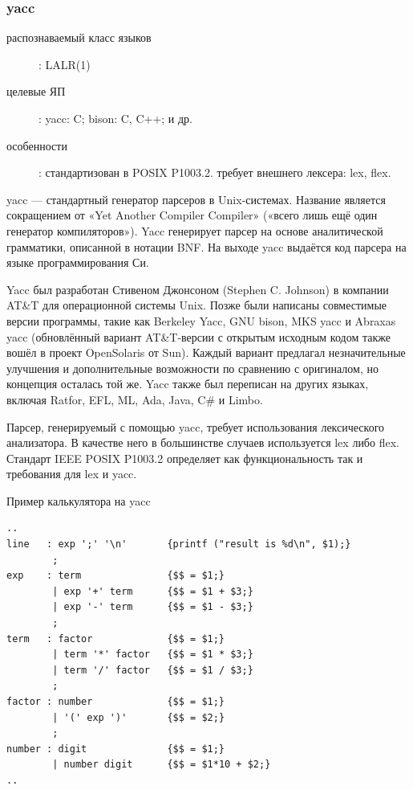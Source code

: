 \documentclass[a4paper,12pt]{article}
\begin{document}
\subsubsection*{yacc}
\begin{description}
  \item[распознаваемый класс языков]: LALR(1)
  \item[целевые ЯП]: yacc: C; bison: C, C++; и др.
  \item[особенности]: стандартизован в POSIX P1003.2. требует внешнего лексера: lex, flex.
\end{description}
yacc — стандартный генератор парсеров в Unix-системах. Название является
сокращением от «Yet Another Compiler Compiler» («всего лишь ещё один генератор
компиляторов»). Yacc генерирует парсер на основе аналитической грамматики,
описанной в нотации BNF. На выходе yacc выдаётся код парсера на языке
программирования Си.

Yacc был разработан Стивеном Джонсоном (Stephen C. Johnson) в компании AT\&T
для операционной системы Unix. Позже были написаны совместимые версии
программы, такие как Berkeley Yacc, GNU bison, MKS yacc и Abraxas yacc
(обновлённый вариант AT\&T-версии с открытым исходным кодом также вошёл в
проект OpenSolaris от Sun). Каждый вариант предлагал незначительные улучшения и
дополнительные возможности по сравнению с оригиналом, но концепция осталась той
же. Yacc также был переписан на других языках, включая Ratfor, EFL, ML, Ada,
Java, C\# и Limbo.

Парсер, генерируемый с помощью yacc, требует использования лексического
анализатора. В качестве него в большинстве случаев используется lex либо
flex. Стандарт IEEE POSIX P1003.2 определяет как функциональность так и
требования для lex и yacc.

\begin{example}
Пример калькулятора на yacc
\end{example}
\begin{verbatim}
..
line   : exp ';' '\n'       {printf ("result is %d\n", $1);}
        ;
exp    : term               {$$ = $1;}
        | exp '+' term      {$$ = $1 + $3;}
        | exp '-' term      {$$ = $1 - $3;}
        ;
term   : factor             {$$ = $1;}
        | term '*' factor   {$$ = $1 * $3;}
        | term '/' factor   {$$ = $1 / $3;}
        ;
factor : number             {$$ = $1;}
        | '(' exp ')'       {$$ = $2;}
        ;
number : digit              {$$ = $1;}
        | number digit      {$$ = $1*10 + $2;}
..
\end{verbatim}
\end{document}
